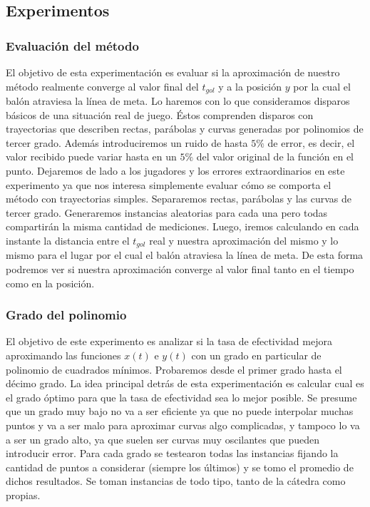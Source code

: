 \subsection{Experimentos}

\subsubsection{Evaluación del método}
El objetivo de esta experimentación es evaluar si la aproximación de nuestro método realmente converge al valor final del $t_{gol}$ y a 
la posición $y$ por la cual el balón atraviesa la línea de meta. Lo haremos con lo que consideramos disparos básicos de una situación
real de juego. Éstos comprenden disparos con trayectorias que describen rectas, parábolas y curvas generadas por polinomios de tercer
grado. Además introduciremos un ruido de hasta $5\%$ de error, es decir, el valor recibido puede variar hasta en un $5\%$ del valor
original de la función en el punto. Dejaremos de lado a los jugadores y los errores extraordinarios en este experimento ya que nos interesa
simplemente evaluar cómo se comporta el método con trayectorias simples.
Separaremos rectas, parábolas y las curvas de tercer grado. Generaremos instancias aleatorias para cada una pero todas compartirán la misma
cantidad de mediciones. Luego, iremos calculando en cada instante la distancia entre el $t_{gol}$ real y nuestra aproximación del mismo y lo
mismo para el lugar por el cual el balón atraviesa la línea de meta. De esta forma podremos ver si nuestra aproximación converge al
valor final tanto en el tiempo como en la posición.

\subsubsection{Grado del polinomio}
El objetivo de este experimento es analizar si la tasa de efectividad mejora aproximando las funciones $x(t)$ e $y(t)$ con un grado en 
particular de polinomio de cuadrados mínimos. Probaremos desde el primer grado hasta el décimo grado. La idea principal detrás de esta experimentación es calcular cual es el grado óptimo para que la tasa de efectividad sea lo mejor posible. Se presume que un grado muy bajo no va a ser eficiente ya que no puede interpolar muchas puntos y va a ser malo para aproximar curvas algo complicadas, y tampoco lo va a ser un grado alto, ya que suelen ser curvas muy oscilantes que pueden introducir error. Para cada grado se testearon todas las instancias fijando la cantidad de puntos a considerar (siempre los últimos) y se tomo el promedio de dichos resultados. Se toman instancias de todo tipo, tanto de la cátedra como propias.

